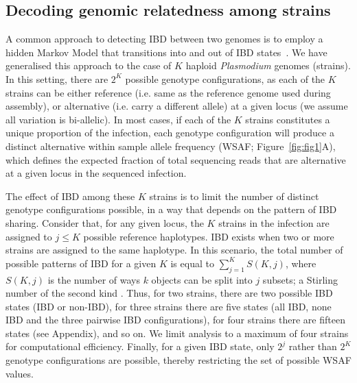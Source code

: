 \documentclass[9pt,lineno]{elife}
\begin{document}
\subsection{Decoding genomic relatedness among strains}

A common approach to detecting IBD between two genomes is to employ a hidden Markov Model that transitions into and out of IBD states~\citep{Chang2015, Gusev2009, Gusev2011}.  We have generalised this approach to the case of $K$ haploid {\it Plasmodium} genomes (strains). In this setting, there are $2^K$ possible genotype configurations, as each of the $K$ strains can be either reference (i.e. same as the reference genome used during assembly), or alternative (i.e. carry a different allele) at a given locus (we assume all variation is bi-allelic). In most cases, if each of the $K$ strains constitutes a unique proportion of the infection, each genotype configuration will produce a distinct alternative within sample allele frequency (WSAF; Figure~\ref{fig:fig1}A), which defines the expected fraction of total sequencing reads that are alternative at a given locus in the sequenced infection. 

The effect of IBD among these $K$ strains is to limit the number of distinct genotype configurations possible, in a way that depends on the pattern of IBD sharing. Consider that, for any given locus, the $K$ strains in the infection are assigned to $j \leq K$ possible reference haplotypes. IBD exists when two or more strains are assigned to the same haplotype. In this scenario, the total number of possible patterns of IBD for a given $K$ is equal to $\sum_{j=1}^{K} S(K,j)$, where $S(K,j)$ is the number of ways $k$ objects can be split into $j$ subsets; a Stirling number of the second kind \citep{Ronald1988}. Thus, for two strains, there are two possible IBD states (IBD or non-IBD), for three strains there are five states (all IBD, none IBD and the three pairwise IBD configurations), for four strains there are fifteen states (see Appendix), and so on. We limit analysis to a maximum of four strains for computational efficiency. Finally, for a given IBD state, only $2^j$ rather than $2^K$ genotype configurations are possible, thereby restricting the set of possible WSAF values.
\end{document}
